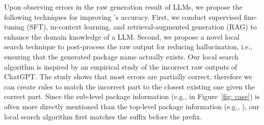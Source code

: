 
Upon observing errors in the raw generation result of LLMs, we propose the following techniques for improving \detector{}'s accuracy. 
First, we conduct supervised fine-tuning (SFT), in-context learning, and retrieval-augmented generation (RAG) to enhance the domain knowledge of a LLM.
Second, we propose a novel local search technique to post-process the raw output for reducing hallucination, i.e., ensuring that the generated package name actually exists. Our local search algorithm is inspired by an empirical study of the incorrect raw outputs of ChatGPT. The study shows that most errors are partially correct, therefore we can create rules to match the incorrect part to the closest existing one given the correct part. Since the sub-level package information (e.g.,  in Figure~\ref{fig: case}) is often more directly mentioned than the top-level package information (e.g., ), our local search algorithm first matches the suffix before the prefix. 

